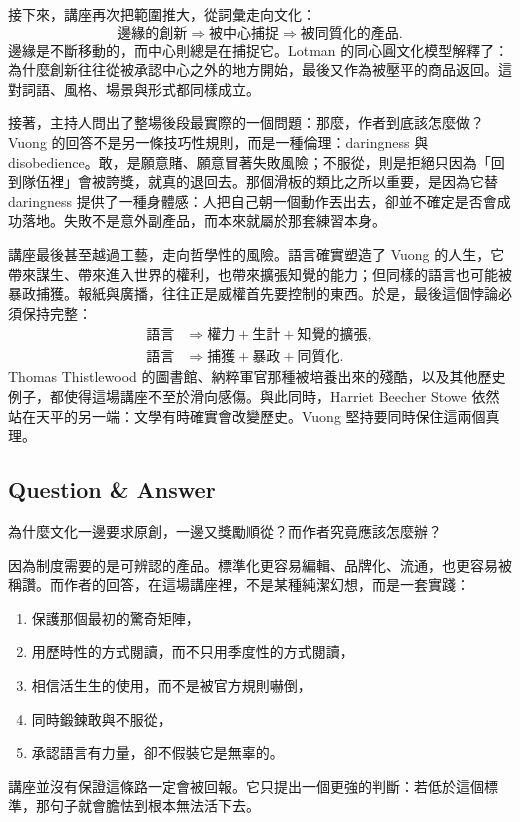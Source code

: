 接下來，講座再次把範圍推大，從詞彙走向文化：
\begin{equation}
\text{邊緣的創新} \Longrightarrow \text{被中心捕捉} \Longrightarrow \text{被同質化的產品}.
\end{equation}
邊緣是不斷移動的，而中心則總是在捕捉它。Lotman 的同心圓文化模型解釋了：為什麼創新往往從被承認中心之外的地方開始，最後又作為被壓平的商品返回。這對詞語、風格、場景與形式都同樣成立。

接著，主持人問出了整場後段最實際的一個問題：那麼，作者到底該怎麼做？Vuong 的回答不是另一條技巧性規則，而是一種倫理：daringness 與 disobedience。敢，是願意賭、願意冒著失敗風險；不服從，則是拒絕只因為「回到隊伍裡」會被誇獎，就真的退回去。那個滑板的類比之所以重要，是因為它替 daringness 提供了一種身體感：人把自己朝一個動作丟出去，卻並不確定是否會成功落地。失敗不是意外副產品，而本來就屬於那套練習本身。

講座最後甚至越過工藝，走向哲學性的風險。語言確實塑造了 Vuong 的人生，它帶來謀生、帶來進入世界的權利，也帶來擴張知覺的能力；但同樣的語言也可能被暴政捕獲。報紙與廣播，往往正是威權首先要控制的東西。於是，最後這個悖論必須保持完整：
\begin{align}
\text{語言} &\Longrightarrow \text{權力} + \text{生計} + \text{知覺的擴張},\\
\text{語言} &\Longrightarrow \text{捕獲} + \text{暴政} + \text{同質化}.
\end{align}
Thomas Thistlewood 的圖書館、納粹軍官那種被培養出來的殘酷，以及其他歷史例子，都使得這場講座不至於滑向感傷。與此同時，Harriet Beecher Stowe 依然站在天平的另一端：文學有時確實會改變歷史。Vuong 堅持要同時保住這兩個真理。

\subsection{Question \& Answer}

為什麼文化一邊要求原創，一邊又獎勵順從？而作者究竟應該怎麼辦？

因為制度需要的是可辨認的產品。標準化更容易編輯、品牌化、流通，也更容易被稱讚。而作者的回答，在這場講座裡，不是某種純潔幻想，而是一套實踐：
\begin{enumerate}
\item 保護那個最初的驚奇矩陣，
\item 用歷時性的方式閱讀，而不只用季度性的方式閱讀，
\item 相信活生生的使用，而不是被官方規則嚇倒，
\item 同時鍛鍊敢與不服從，
\item 承認語言有力量，卻不假裝它是無辜的。
\end{enumerate}
講座並沒有保證這條路一定會被回報。它只提出一個更強的判斷：若低於這個標準，那句子就會膽怯到根本無法活下去。

